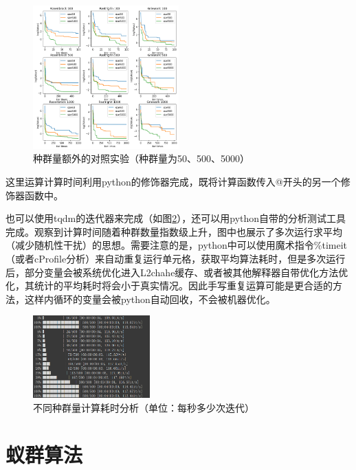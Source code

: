 \documentclass[lang=cn,11pt]{elegantpaper}
\begin{document}
\begin{figure}[ht]
  \centering
  \includegraphics[width=0.5\textwidth]{figure/PSO/种群量额外的对照实验（种群量为50、500、5000）.png} %
  \caption{种群量额外的对照实验（种群量为50、500、5000）} %
  \label{img:种群量额外的对照实验}
\end{figure}

这里运算计算时间利用python的修饰器完成，既将计算函数传入@开头的另一个修饰器函数中。

也可以使用tqdm的迭代器来完成（如图\ref{img:不同种群量计算耗时分析}），还可以用python自带的分析测试工具完成。观察到计算时间随着种群数量指数级上升，图中也展示了多次运行求平均（减少随机性干扰）的思想。需要注意的是，python中可以使用魔术指令\%timeit（或者cProfile分析）来自动重复运行单元格，获取平均算法耗时，但是多次运行后，部分变量会被系统优化进入L2chahe缓存、或者被其他解释器自带优化方法优化，其统计的平均耗时将会小于真实情况。因此手写重复运算可能是更合适的方法，这样内循环的变量会被python自动回收，不会被机器优化。

\begin{figure}[ht]
  \centering
  \includegraphics[width=0.4\textwidth]{figure/PSO/提前停止位置（W从0.05增加到1）.png} %
  \caption{不同种群量计算耗时分析（单位：每秒多少次迭代）} %
  \label{img:不同种群量计算耗时分析}
\end{figure}




\section{蚁群算法}
\end{document}

